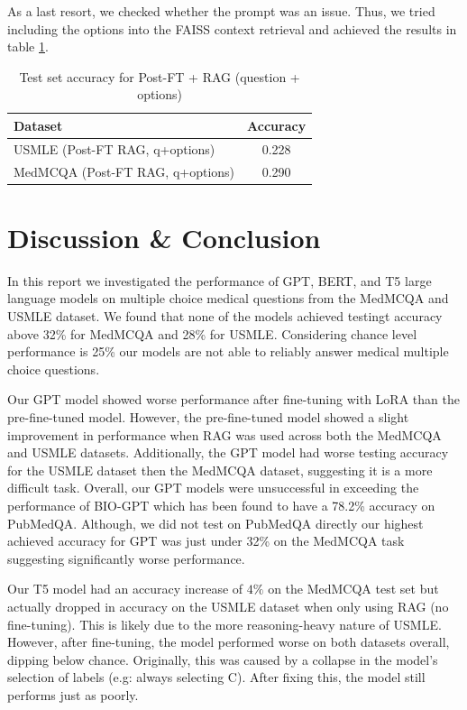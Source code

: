 \documentclass{article}
\begin{document}
As a last resort, we checked whether the prompt was an issue. Thus, we tried including the options into the FAISS context retrieval and achieved the results in table \ref{tab:rag_results}.

\begin{table}[h]
    \centering
    \small
    \setlength{\tabcolsep}{4pt} %
    \begin{tabular}{l c}
        \hline
        \textbf{Dataset}                 & \textbf{Accuracy} \\
        \hline
        USMLE (Post-FT RAG, q+options)   & 0.228             \\
        MedMCQA (Post-FT RAG, q+options) & 0.290             \\
        \hline
    \end{tabular}
    \caption{Test set accuracy for Post-FT + RAG (question + options)}
    \label{tab:rag_results}
\end{table}

\section{Discussion \& Conclusion}
In this report we investigated the performance of GPT, BERT, and T5 large language models on multiple choice medical questions from the MedMCQA and USMLE dataset. We found that none of the models achieved testingt accuracy above 32\% for MedMCQA and 28\% for USMLE. Considering chance level performance is 25\% our models are not able to reliably answer medical multiple choice questions. 

Our GPT model showed worse performance after fine-tuning with LoRA than the pre-fine-tuned model. However, the pre-fine-tuned model showed a slight improvement in performance when RAG was used across both the MedMCQA and USMLE datasets. Additionally, the GPT model had worse testing accuracy for the USMLE dataset then the MedMCQA dataset, suggesting it is a more difficult task. Overall, our GPT models were unsuccessful in exceeding the performance of BIO-GPT which has been found to have a 78.2\% accuracy on PubMedQA. Although, we did not test on PubMedQA directly our highest achieved accuracy for GPT was just under 32\% on the MedMCQA task suggesting significantly worse performance\cite{Luo_2022}.

Our T5 model had an accuracy increase of $4\%$ on the MedMCQA test set but actually dropped in accuracy on the USMLE dataset when only using RAG (no fine-tuning). This is likely due to the more reasoning-heavy nature of USMLE. However, after fine-tuning, the model performed worse on both datasets overall, dipping below chance. Originally, this was caused by a collapse in the model's selection of labels (e.g: always selecting C). After fixing this, the model still performs just as poorly.
\end{document}
